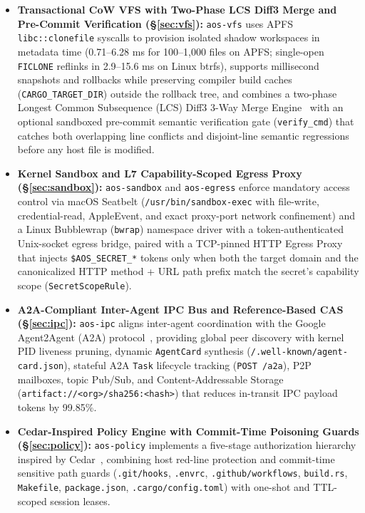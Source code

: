 \documentclass[10pt,twocolumn]{article}
\begin{document}
\begin{itemize}
    \item \textbf{Transactional CoW VFS with Two-Phase LCS Diff3 Merge and Pre-Commit Verification (\S\ref{sec:vfs}):} \texttt{aos-vfs} uses APFS \texttt{libc::clonefile} syscalls to provision isolated shadow workspaces in metadata time (0.71--6.28 ms for 100--1,000 files on APFS; single-open \texttt{FICLONE} reflinks in 2.9--15.6 ms on Linux btrfs), supports millisecond snapshots and rollbacks while preserving compiler build caches (\texttt{CARGO\_TARGET\_DIR}) outside the rollback tree, and combines a two-phase Longest Common Subsequence (LCS) Diff3 3-Way Merge Engine~\cite{khanna2007formal} with an optional sandboxed pre-commit semantic verification gate (\texttt{verify\_cmd}) that catches both overlapping line conflicts and disjoint-line semantic regressions before any host file is modified.
    \item \textbf{Kernel Sandbox and L7 Capability-Scoped Egress Proxy (\S\ref{sec:sandbox}):} \texttt{aos-sandbox} and \texttt{aos-egress} enforce mandatory access control via macOS Seatbelt (\texttt{/usr/bin/sandbox-exec} with file-write, credential-read, AppleEvent, and exact proxy-port network confinement) and a Linux Bubblewrap (\texttt{bwrap}) namespace driver with a token-authenticated Unix-socket egress bridge, paired with a TCP-pinned HTTP Egress Proxy that injects \texttt{\$AOS\_SECRET\_*} tokens only when both the target domain and the canonicalized HTTP method + URL path prefix match the secret's capability scope (\texttt{SecretScopeRule}).
    \item \textbf{A2A-Compliant Inter-Agent IPC Bus and Reference-Based CAS (\S\ref{sec:ipc}):} \texttt{aos-ipc} aligns inter-agent coordination with the Google Agent2Agent (A2A) protocol~\cite{google2025a2a}, providing global peer discovery with kernel PID liveness pruning, dynamic \texttt{AgentCard} synthesis (\texttt{/.well-known/agent-card.json}), stateful A2A \texttt{Task} lifecycle tracking (\texttt{POST /a2a}), P2P mailboxes, topic Pub/Sub, and Content-Addressable Storage (\texttt{artifact://<org>/sha256:<hash>}) that reduces in-transit IPC payload tokens by 99.85\%.
    \item \textbf{Cedar-Inspired Policy Engine with Commit-Time Poisoning Guards (\S\ref{sec:policy}):} \texttt{aos-policy} implements a five-stage authorization hierarchy inspired by Cedar~\cite{cutler2024cedar}, combining host red-line protection and commit-time sensitive path guards (\texttt{.git/hooks}, \texttt{.envrc}, \texttt{.github/workflows}, \texttt{build.rs}, \texttt{Makefile}, \texttt{package.json}, \texttt{.cargo/config.toml}) with one-shot and TTL-scoped session leases.

\end{itemize}
\end{document}
